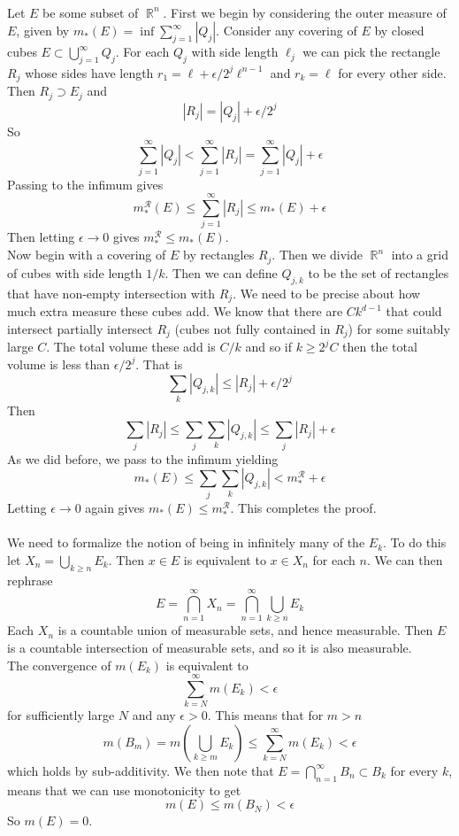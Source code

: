 \documentclass{article}
\DeclareMathOperator{\R}{\mathbb{R}}
\newcommand{\problem}[1]{\noindent{\textbf{Problem #1}}\\}
\newcommand{\problempart}[1]{\noindent{\textbf{(#1)}}}
\begin{document}
\problem{1.6.15} Let $E$ be some subset of $\R^n$. First we begin by considering the outer measure of $E$, given by $m_*(E) = \inf\sum_{j=1}^\infty |Q_j|$. Consider any covering of $E$ by closed cubes $E \subset \bigcup_{j=1}^\infty Q_j$. For each $Q_j$ with side length $\ell_j$ we can pick the rectangle $R_j$ whose sides have length $r_1 = \ell + \epsilon/2^j\ell^{n-1}$ and $r_k = \ell$ for every other side. Then $R_j \supset E_j$ and 
\[
|R_j| = |Q_j| + \epsilon/2^j
\]
So 
\[
\sum_{j=1}^\infty |Q_j| < \sum_{j=1}^\infty |R_j| = \sum_{j=1}^\infty|Q_j| + \epsilon
\]
Passing to the infimum gives
\[
m_*^\mathcal{R}(E) \leq \sum_{j=1}^\infty |R_j| \leq  m_*(E) + \epsilon
\]
Then letting $\epsilon \to 0$ gives $m_*^\mathcal{R} \leq m_*(E)$. \\
\indent Now begin with a covering of $E$ by rectangles $R_j$. Then we divide $\R^n$ into a grid of cubes with side length $1/k$. Then we can define $Q_{j,k}$ to be the set of rectangles that have non-empty intersection with $R_j$. We need to be precise about how much extra measure these cubes add. We know that there are $Ck^{d-1}$ that could intersect partially intersect $R_j$ (cubes not fully contained in $R_j$) for some suitably large $C$. The total volume these add is $C/k$ and so if $k \geq 2^jC$ then the total volume  is less than $\epsilon/2^j$. That is
\[
\sum_k |Q_{j,k}| \leq |R_j| + \epsilon/2^j
\] 
Then 
\[
\sum_j |R_j| \leq \sum_j\sum_k |Q_{j,k}| \leq \sum_{j}|R_j| + \epsilon
\]
As we did before, we pass to the infimum yielding 
\[
m_*(E) \leq \sum_j\sum_k |Q_{j,k}| < m_*^\mathcal{R} + \epsilon
\]
Letting $\epsilon \to 0$ again gives $m_*(E) \leq m_*^\mathcal{R}$. This completes the proof. \\

\problem{1.6.16}
\problempart{a} We need to formalize the notion of being in infinitely many of the $E_k$. To do this let $X_n = \bigcup_{k \geq n} E_k$. Then $x \in E$ is equivalent to $x \in X_n$ for each $n$. We can then rephrase 
\[
E = \bigcap_{n=1}^\infty X_n =\bigcap_{n=1}^\infty \bigcup_{k \geq n} E_k
\]
Each $X_n$ is a countable union of measurable sets, and hence measurable. Then $E$ is a countable intersection of measurable sets, and so it is also measurable. \\
\problempart{b} The convergence of $m(E_k)$ is equivalent to 
\[
\sum_{k=N}^\infty m(E_k) < \epsilon
\]
for sufficiently large $N$ and any $\epsilon > 0$. This means that for $m > n$
\[
m(B_m) = m\left(\bigcup_{k \geq m} E_k\right) \leq \sum_{k=N}^\infty m(E_k) < \epsilon 
\]
which holds by sub-additivity. We then note that $E = \bigcap_{n=1}^\infty B_n \subset B_k$ for every $k$, means that we can use monotonicity to get
\[
m(E) \leq m(B_N) < \epsilon 
\]
So $m(E) = 0$.  
\end{document}
